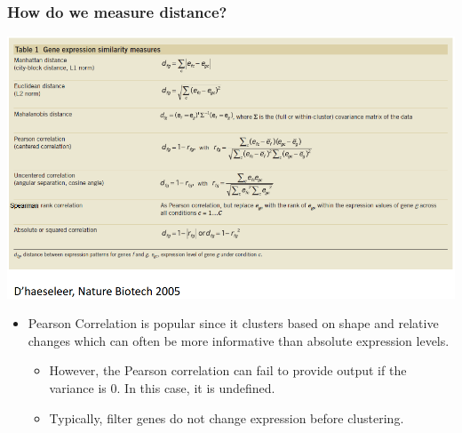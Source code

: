 \documentclass[10pt]{article}
\begin{document}
\subsubsection*{How do we measure distance?}
\begin{center}
    \includegraphics[width=\textwidth]{W6_7.png}
\end{center}
\begin{itemize}
    \item Pearson Correlation is popular since it clusters based on shape and relative changes which can often be more informative than absolute expression levels.
    \begin{itemize}
        \item However, the Pearson correlation can fail to provide output if the variance is 0.  In this case, it is undefined.
        \item Typically, filter genes do not change expression before clustering.
    \end{itemize}
\end{itemize}
\end{document}
